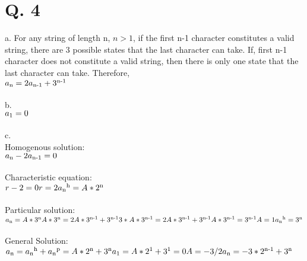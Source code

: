 \documentclass[10pt]{article}
\begin{document}
\section*{Q. 4}
a.
For any string of length n, $n>1$, if the first n-1 character constitutes a valid string, there are 3 possible states that the last character can take. If, first n-1 character does not constitute a valid string, then there is only one state that the last character can take. Therefore,\\
$a\textsubscript{n} = 2a\textsubscript{n-1} + 3\textsuperscript{n-1}$\\\\b.\\$a\textsubscript{1} = 0$\\\\c.\\Homogenous solution:\\$a\textsubscript{n}-2a\textsubscript{n-1}=0$\\\\Characteristic equation:\\$r-2=0\\r=2\\a\textsubscript{n}\textsuperscript{h}=A*2\textsuperscript{n}$\\\\Particular solution:\\
$a\textsubscript{n}=A*3\textsuperscript{n}\\A*3\textsuperscript{n}=2A*3\textsuperscript{n-1}+3\textsuperscript{n-1}\\3*A*3\textsuperscript{n-1}=2A*3\textsuperscript{n-1}+3\textsuperscript{n-1}\\A*3\textsuperscript{n-1}=3\textsuperscript{n-1}\\A=1\\a\textsubscript{n}\textsuperscript{h}=3\textsuperscript{n}$\\\\
General Solution:\\
$a\textsubscript{n}=a\textsubscript{n}\textsuperscript{h}+a\textsubscript{n}\textsuperscript{p}=A*2\textsuperscript{n}+3\textsuperscript{n}\\
a\textsubscript{1}=A*2\textsuperscript{1}+3\textsuperscript{1}=0\\
A=-3/2\\
a\textsubscript{n}=-3*2\textsuperscript{n-1}+3\textsuperscript{n}$
\end{document}
